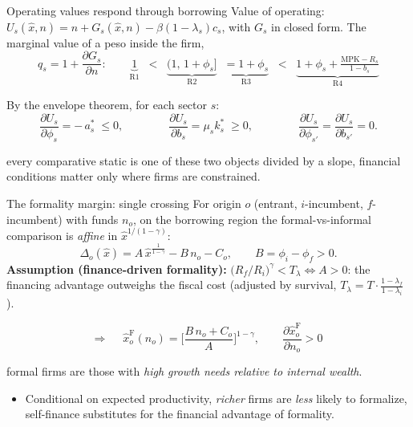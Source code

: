 \documentclass[11pt,aspectratio=169]{beamer}
\providecommand{\infml}{i}
\providecommand{\fml}{f}
\providecommand{\curv}{\gamma}
\providecommand{\prodxhat}{\hat{x}}
\providecommand{\spread}[1]{\phi_{#1}}
\providecommand{\collat}[1]{b_{#1}}
\providecommand{\Rext}[1]{R_{#1}}
\providecommand{\fc}[1]{c_{#1}}
\providecommand{\death}[1]{\lambda_{#1}}
\providecommand{\netw}{n}
\providecommand{\thF}[1]{\hat{x}^{\mathrm{F}}_{#1}}
\providecommand{\Uv}[1]{U_{#1}}
\begin{document}
\begin{frame}{Operating values respond through borrowing}
Value of operating: $\Uv{s}(\prodxhat,\netw)=\netw
+G_{s}(\prodxhat,\netw)-\beta(1-\death{s})\fc{s}$, with $G_{s}$ in
closed form. The marginal value of a peso inside the firm,
\begin{equation*}
  q_{s}=1+\frac{\partial G_{s}}{\partial\netw}:\qquad
  \underbrace{1}_{\text{R1}}\;\;<\;\;
  \underbrace{(1,\,1+\spread{s}]}_{\text{R2}}\;\;
  \underbrace{=1+\spread{s}}_{\text{R3}}\;\;<\;\;
  \underbrace{1+\spread{s}
  +\tfrac{\mathrm{MPK}-\Rext{s}}{1-\collat{s}}}_{\text{R4}}
\end{equation*}

By the envelope theorem, for each sector $s$:
\begin{equation*}
  \frac{\partial\Uv{s}}{\partial\spread{s}}=-\,a^{*}_{s}\;\leq 0,
  \qquad\qquad
  \frac{\partial\Uv{s}}{\partial\collat{s}}=\mu_{s}k^{*}_{s}\;\geq 0,
  \qquad\qquad
  \frac{\partial\Uv{s}}{\partial\spread{s'}}
  =\frac{\partial\Uv{s}}{\partial\collat{s'}}=0 .
\end{equation*}
 
\medskip
{} every comparative static is one of these two objects divided by a slope, financial conditions
matter only where firms are constrained.
\end{frame}
 
\begin{frame}{The formality margin: single crossing}
For origin $o$ (entrant, $\infml$-incumbent, $\fml$-incumbent) with
funds $\netw_{o}$, on the borrowing region the formal-vs-informal
comparison is \emph{affine} in $\prodxhat^{1/(1-\curv)}$:
\begin{equation*}
  \Delta_{o}(\prodxhat)=A\,\prodxhat^{\frac{1}{1-\curv}}
  -B\,\netw_{o}-C_{o},\qquad
  B=\spread{\infml}-\spread{\fml}>0 .
\end{equation*}
\textbf{Assumption (finance-driven formality):}
$\big(\Rext{\fml}/\Rext{\infml}\big)^{\curv}<T_{\lambda}
\iff A>0$: the financing advantage outweighs the fiscal cost
(adjusted by survival, $T_{\lambda}=T\cdot
\tfrac{1-\death{\fml}}{1-\death{\infml}}$).
 
\begin{equation*}
  \Rightarrow\quad
  \boxed{\;\thF{o}(\netw_{o})
  =\Big[\frac{B\,\netw_{o}+C_{o}}{A}\Big]^{1-\curv},\qquad
  \frac{\partial\thF{o}}{\partial\netw_{o}}>0\;}
\end{equation*}
 
 formal firms are those with \emph{high
growth needs relative to internal wealth}.
\begin{itemize}
    \item Conditional on expected
productivity, \emph{richer} firms are \emph{less} likely to
formalize, self-finance substitutes for the financial advantage of
formality.
\end{itemize}

\end{frame}
 
\end{document}
